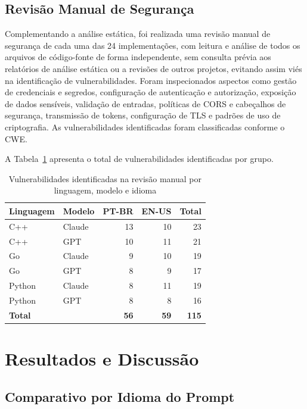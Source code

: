 \documentclass[12pt]{article}
\begin{document}
\subsection{Revisão Manual de Segurança}

Complementando a análise estática, foi realizada uma revisão manual de segurança de cada uma das 24 implementações, com leitura e análise de todos os arquivos de código-fonte de forma independente, sem consulta prévia aos relatórios de análise estática ou a revisões de outros projetos, evitando assim viés na identificação de vulnerabilidades. Foram inspecionados aspectos como gestão de credenciais e segredos, configuração de autenticação e autorização, exposição de dados sensíveis, validação de entradas, políticas de CORS e cabeçalhos de segurança, transmissão de tokens, configuração de TLS e padrões de uso de criptografia. As vulnerabilidades identificadas foram classificadas conforme o CWE.

A Tabela~\ref{tab:manual} apresenta o total de vulnerabilidades identificadas por grupo.

\begin{table}[ht]
\centering
\caption{Vulnerabilidades identificadas na revisão manual por linguagem, modelo e idioma}
\label{tab:manual}
\begin{tabular}{llrrr}
\hline
\textbf{Linguagem} & \textbf{Modelo} & \textbf{PT-BR} & \textbf{EN-US} & \textbf{Total} \\
\hline
C++ & Claude & 13 & 10 & 23 \\
C++ & GPT   & 10 & 11 & 21 \\
Go  & Claude &  9 & 10 & 19 \\
Go  & GPT   &  8 &  9 & 17 \\
Python & Claude &  8 & 11 & 19 \\
Python & GPT   &  8 &  8 & 16 \\
\hline
\textbf{Total} & & \textbf{56} & \textbf{59} & \textbf{115} \\
\hline
\end{tabular}
\end{table}

\section{Resultados e Discussão}
\label{sec:resultados}

\subsection{Comparativo por Idioma do Prompt}
\end{document}
